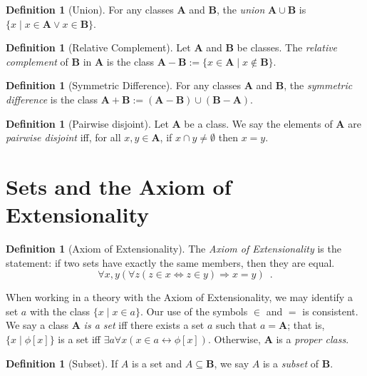 \documentclass{book}
\theoremstyle{definition}
\newtheorem{df}[ax]{Definition}
\begin{document}
\begin{df}[Union]
For any classes $\mathbf{A}$ and $\mathbf{B}$, the \emph{union} $\mathbf{A} \cup \mathbf{B}$ is $\{ x \mid x \in \mathbf{A} \vee x \in \mathbf{B} \}$.
\end{df}

\begin{df}[Relative Complement]
Let $\mathbf{A}$ and $\mathbf{B}$ be classes. The \emph{relative complement} of $\mathbf{B}$ in $\mathbf{A}$ is the class $\mathbf{A} - \mathbf{B} := \{x \in \mathbf{A} \mid x \notin \mathbf{B} \}$.
\end{df}

\begin{df}[Symmetric Difference]
For any classes $\mathbf{A}$ and $\mathbf{B}$, the \emph{symmetric difference} is the class $\mathbf{A} + \mathbf{B} := (\mathbf{A} - \mathbf{B}) \cup (\mathbf{B} - \mathbf{A})$.
\end{df}

\begin{df}[Pairwise disjoint]
Let $\mathbf{A}$ be a class. We say the elements of $\mathbf{A}$ are \emph{pairwise disjoint} iff, for all $x, y \in \mathbf{A}$, if $x \cap y \neq \emptyset$ then $x = y$.
\end{df}

\section{Sets and the Axiom of Extensionality}
	
\begin{df}[Axiom of Extensionality]
The \emph{Axiom of Extensionality} is the statement: if two sets have exactly the same members, then they are equal.
\[ \forall x, y (\forall z (z \in x \Leftrightarrow z \in y) \Rightarrow x = y) \enspace . \]

When working in a theory with the Axiom of Extensionality, we may identify a set $a$ with the class $\{x \mid x \in a\}$. Our use of the symbols $\in$ and $=$ is consistent. We say a class $\mathbf{A}$ \emph{is a set} iff there exists a set $a$ such that $a = \mathbf{A}$; that is, $\{x \mid \phi[x]\}$ is a set iff $\exists a \forall x (x \in a \leftrightarrow \phi[x])$. Otherwise, $\mathbf{A}$ is a \emph{proper class}.
\end{df}

\begin{df}[Subset]
If $A$ is a set and $A \subseteq \mathbf{B}$, we say $A$ is a \emph{subset} of $\mathbf{B}$.
\end{df}
\end{document}
